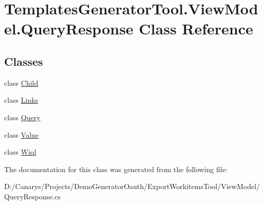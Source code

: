 \hypertarget{class_templates_generator_tool_1_1_view_model_1_1_query_response}{}\section{Templates\+Generator\+Tool.\+View\+Model.\+Query\+Response Class Reference}
\label{class_templates_generator_tool_1_1_view_model_1_1_query_response}
\subsection*{Classes}
\begin{DoxyCompactItemize}
\item 
class \mbox{\hyperlink{class_templates_generator_tool_1_1_view_model_1_1_query_response_1_1_child}{Child}}
\item 
class \mbox{\hyperlink{class_templates_generator_tool_1_1_view_model_1_1_query_response_1_1_links}{Links}}
\item 
class \mbox{\hyperlink{class_templates_generator_tool_1_1_view_model_1_1_query_response_1_1_query}{Query}}
\item 
class \mbox{\hyperlink{class_templates_generator_tool_1_1_view_model_1_1_query_response_1_1_value}{Value}}
\item 
class \mbox{\hyperlink{class_templates_generator_tool_1_1_view_model_1_1_query_response_1_1_wiql}{Wiql}}
\end{DoxyCompactItemize}


The documentation for this class was generated from the following file\+:\begin{DoxyCompactItemize}
\item 
D\+:/\+Canarys/\+Projects/\+Demo\+Generator\+Oauth/\+Export\+Workitems\+Tool/\+View\+Model/Query\+Response.\+cs\end{DoxyCompactItemize}
